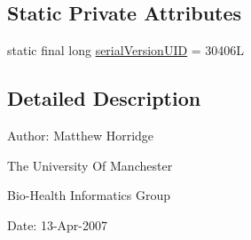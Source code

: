 \subsection*{Static Private Attributes}
\begin{DoxyCompactItemize}
\item 
static final long \hyperlink{classorg_1_1coode_1_1owlapi_1_1rdfxml_1_1parser_1_1_o_w_l_r_d_f_x_m_l_parser_malformed_node_exception_a868e53d8d0815e4a00352bef97b11cc7}{serial\-Version\-U\-I\-D} = 30406\-L
\end{DoxyCompactItemize}


\subsection{Detailed Description}
Author\-: Matthew Horridge\par
 The University Of Manchester\par
 Bio-\/\-Health Informatics Group\par
 Date\-: 13-\/\-Apr-\/2007\par
\par
 

